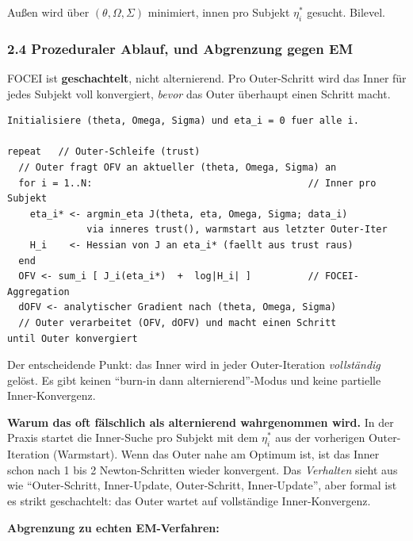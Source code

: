 \documentclass[
]{article}
\begin{document}
Außen wird über \((\theta, \Omega, \Sigma)\) minimiert, innen pro
Subjekt \(\eta_i^*\) gesucht. Bilevel.

\subsubsection{2.4 Prozeduraler Ablauf, und Abgrenzung gegen
EM}\label{prozeduraler-ablauf-und-abgrenzung-gegen-em}

FOCEI ist \textbf{geschachtelt}, nicht alternierend. Pro Outer-Schritt
wird das Inner für jedes Subjekt voll konvergiert, \emph{bevor} das
Outer überhaupt einen Schritt macht.

\begin{verbatim}
Initialisiere (theta, Omega, Sigma) und eta_i = 0 fuer alle i.

repeat   // Outer-Schleife (trust)
  // Outer fragt OFV an aktueller (theta, Omega, Sigma) an
  for i = 1..N:                                      // Inner pro Subjekt
    eta_i* <- argmin_eta J(theta, eta, Omega, Sigma; data_i)
              via inneres trust(), warmstart aus letzter Outer-Iter
    H_i    <- Hessian von J an eta_i* (faellt aus trust raus)
  end
  OFV <- sum_i [ J_i(eta_i*)  +  log|H_i| ]          // FOCEI-Aggregation
  dOFV <- analytischer Gradient nach (theta, Omega, Sigma)
  // Outer verarbeitet (OFV, dOFV) und macht einen Schritt
until Outer konvergiert
\end{verbatim}

Der entscheidende Punkt: das Inner wird in jeder Outer-Iteration
\emph{vollständig} gelöst. Es gibt keinen ``burn-in dann
alternierend''-Modus und keine partielle Inner-Konvergenz.

\textbf{Warum das oft fälschlich als alternierend wahrgenommen wird.} In
der Praxis startet die Inner-Suche pro Subjekt mit dem \(\eta_i^*\) aus
der vorherigen Outer-Iteration (Warmstart). Wenn das Outer nahe am
Optimum ist, ist das Inner schon nach 1 bis 2 Newton-Schritten wieder
konvergent. Das \emph{Verhalten} sieht aus wie ``Outer-Schritt,
Inner-Update, Outer-Schritt, Inner-Update'', aber formal ist es strikt
geschachtelt: das Outer wartet auf vollständige Inner-Konvergenz.

\textbf{Abgrenzung zu echten EM-Verfahren:}
\end{document}
